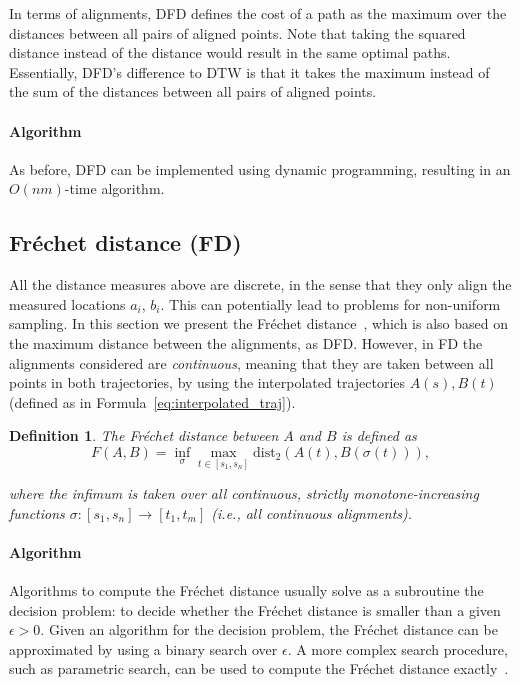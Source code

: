 \documentclass{interact}
\newcommand{\dist}{\ensuremath{\text{dist}}}
\newtheorem{definition}{Definition}
\begin{document}
In terms of alignments, DFD defines the cost of a path as the maximum over the distances between all pairs of aligned points. Note that taking the squared distance instead of the distance would result in the same optimal paths. Essentially, DFD's difference to DTW is that it takes the maximum instead of the sum of the distances between all pairs of aligned points.

\paragraph*{Algorithm} As before, DFD can be implemented using dynamic programming, resulting in an $O(nm)$-time algorithm.


\subsection{Fr\'echet distance (FD)}
All the distance measures above are discrete, in the sense that they only align the measured locations $a_i$, $b_i$. This can potentially lead to problems for non-uniform sampling. In this  section we present the Fr\'echet distance~\citep{ag-cfd-95}, which is also based on the maximum distance between the alignments, as DFD. However, in FD the alignments considered are \emph{continuous}, meaning that they are taken between all points in both trajectories, by using the interpolated trajectories $A(s), B(t)$ (defined as in Formula~\ref{eq:interpolated_traj}).

\begin{definition}
The Fr\'echet distance between $A$ and $B$ is defined as
\[
F(A,B) = \inf_{\sigma} \max_{t \in [s_1,s_n]} \dist_2(A(t),B(\sigma (t))),
\]

where the infimum is taken over all continuous, strictly monotone-increasing functions $\sigma \colon [s_1,s_n] \rightarrow [t_1, t_m]$ (i.e., all continuous alignments).
\end{definition}


\paragraph*{Algorithm} Algorithms to compute the Fr\'echet distance usually solve as a subroutine the decision problem: to decide whether the Fr\'echet distance is smaller than a given $\epsilon > 0$. Given an algorithm for the decision problem, the Fr\'echet distance can be approximated by using a binary search over $\epsilon$. A more complex search procedure, such as parametric search, can be used to compute the Fr\'echet distance exactly~\citep{ag-cfd-95}.
\end{document}
